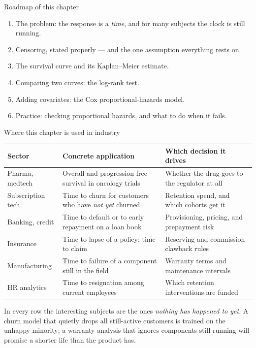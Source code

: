 \documentclass[aspectratio=169,11pt]{beamer}
\begin{document}
\begin{frame}{Roadmap of this chapter}
  \begin{takeaway}
    \begin{enumerate}
      \item The problem: the response is a \emph{time}, and for many subjects the
            clock is still running.
      \item Censoring, stated properly --- and the one assumption everything rests on.
      \item The survival curve and its Kaplan--Meier estimate.
      \item Comparing two curves: the log-rank test.
      \item Adding covariates: the Cox proportional-hazards model.
      \item Practice: checking proportional hazards, and what to do when it fails.
    \end{enumerate}
  \end{takeaway}
\end{frame}

\begin{frame}{Where this chapter is used in industry}
  \scriptsize
  \begin{center}
  \begin{tabular}{@{}p{2.6cm}p{5.2cm}p{4.6cm}@{}}
    \toprule
    \textbf{Sector} & \textbf{Concrete application} & \textbf{Which decision it drives} \\
    \midrule
    Pharma, medtech & Overall and progression-free survival in oncology trials &
      Whether the drug goes to the regulator at all \\
    Subscription tech & Time to churn for customers who have \emph{not yet} churned &
      Retention spend, and which cohorts get it \\
    Banking, credit & Time to default or to early repayment on a loan book &
      Provisioning, pricing, and prepayment risk \\
    Insurance & Time to lapse of a policy; time to claim &
      Reserving and commission clawback rules \\
    Manufacturing & Time to failure of a component still in the field &
      Warranty terms and maintenance intervals \\
    HR analytics & Time to resignation among current employees &
      Which retention interventions are funded \\
    \bottomrule
  \end{tabular}
  \end{center}
  \begin{industry}
    In every row the interesting subjects are the ones \emph{nothing has happened to yet}.
    A churn model that quietly drops all still-active customers is trained on the unhappy
    minority; a warranty analysis that ignores components still running will promise a
    shorter life than the product has.
  \end{industry}
\end{frame}
\end{document}
